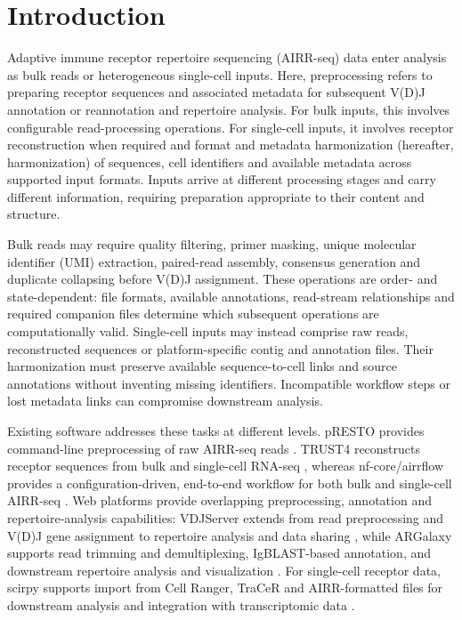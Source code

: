 \documentclass[unnumsec,webpdf,contemporary,large]{oup-authoring-template}
\begin{document}

\maketitle

\section{Introduction}
Adaptive immune receptor repertoire sequencing (AIRR-seq) data enter analysis as bulk reads or heterogeneous single-cell inputs. Here, preprocessing refers to preparing receptor sequences and associated metadata for subsequent V(D)J annotation or reannotation and repertoire analysis. For bulk inputs, this involves configurable read-processing operations. For single-cell inputs, it involves receptor reconstruction when required and format and metadata harmonization (hereafter, harmonization) of sequences, cell identifiers and available metadata across supported input formats. Inputs arrive at different processing stages and carry different information, requiring preparation appropriate to their content and structure.

Bulk reads may require quality filtering, primer masking, unique molecular identifier (UMI) extraction, paired-read assembly, consensus generation and duplicate collapsing before V(D)J assignment. These operations are order- and state-dependent: file formats, available annotations, read-stream relationships and required companion files determine which subsequent operations are computationally valid. Single-cell inputs may instead comprise raw reads, reconstructed sequences or platform-specific contig and annotation files. Their harmonization must preserve available sequence-to-cell links and source annotations without inventing missing identifiers. Incompatible workflow steps or lost metadata links can compromise downstream analysis.

Existing software addresses these tasks at different levels. pRESTO provides command-line preprocessing of raw AIRR-seq reads \citep{vanderheiden2014}. TRUST4 reconstructs receptor sequences from bulk and single-cell RNA-seq \citep{song2021}, whereas nf-core/airrflow provides a configuration-driven, end-to-end workflow for both bulk and single-cell AIRR-seq \citep{gabernet2024}. Web platforms provide overlapping preprocessing, annotation and repertoire-analysis capabilities: VDJServer extends from read preprocessing and V(D)J gene assignment to repertoire analysis and data sharing \citep{christley2018}, while ARGalaxy supports read trimming and demultiplexing, IgBLAST-based annotation, and downstream repertoire analysis and visualization \citep{ijspeert2017}. For single-cell receptor data, scirpy supports import from Cell Ranger, TraCeR and AIRR-formatted files for downstream analysis and integration with transcriptomic data \citep{sturm2020}.
\end{document}
